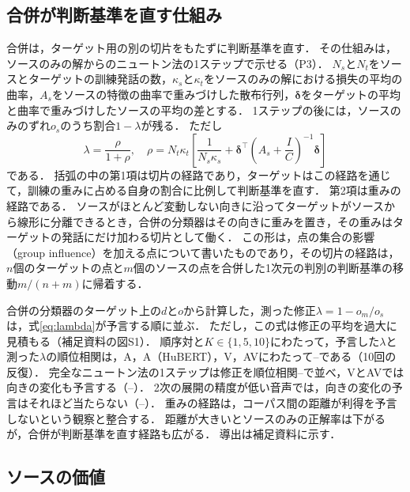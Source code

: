 \subsection{合併が判断基準を直す仕組み}
\label{sec:part1-pooling}

合併は，ターゲット用の別の切片をもたずに判断基準を直す．
その仕組みは，ソースのみの解からのニュートン法の1ステップで示せる（P3）．
$N_s$と$N_t$をソースとターゲットの訓練発話の数，$\kappa_s$と$\kappa_t$をソースのみの解における損失の平均の曲率，$A_s$をソースの特徴の曲率で重みづけした散布行列，$\boldsymbol{\delta}$をターゲットの平均と曲率で重みづけしたソースの平均の差とする．
1ステップの後には，ソースのみのずれ$o_s$のうち割合$1 - \lambda$が残る．
ただし
\begin{equation}
\label{eq:lambda}
\lambda = \frac{\rho}{1 + \rho},\quad \rho = N_t\kappa_t\left[\frac{1}{N_s\kappa_s} + \boldsymbol{\delta}^{\top}\left(A_s + \frac{I}{C}\right)^{-1}\boldsymbol{\delta}\right]
\end{equation}
である．
括弧の中の第1項は切片の経路であり，ターゲットはこの経路を通じて，訓練の重みに占める自身の割合に比例して判断基準を直す．
第2項は重みの経路である．
ソースがほとんど変動しない向きに沿ってターゲットがソースから線形に分離できるとき，合併の分類器はその向きに重みを置き，その重みはターゲットの発話にだけ加わる切片として働く．
この形は，点の集合の影響（group influence）\cite{koh2019accuracy,pregibon1981logistic}を加える点について書いたものであり，その切片の経路は，$n$個のターゲットの点と$m$個のソースの点を合併した1次元の判別の判断基準の移動$m/(n+m)$に帰着する\cite{desilva2023value}．

合併の分類器のターゲット上の$d$と$o$から計算した，測った修正$\lambda = 1 - o_m/o_s$は，式\eqref{eq:lambda}が予言する順に並ぶ．
ただし，この式は修正の平均を過大に見積もる（補足資料の図S1）．
順序対と$K \in \{1, 5, 10\}$にわたって，予言した$\lambda$と測った$\lambda$の順位相関は，A，A（HuBERT），V，AVにわたって--である（10回の反復）．
完全なニュートン法の1ステップは修正を順位相関--で並べ，VとAVでは向きの変化も予言する（--）．
2次の展開の精度が低い音声では，向きの変化の予言はそれほど当たらない（--）．
重みの経路は，コーパス間の距離が利得を予言しないという観察と整合する．
距離が大きいとソースのみの正解率は下がるが，合併が判断基準を直す経路も広がる．
導出は補足資料に示す．

\subsection{ソースの価値}
\label{sec:part1-value}

